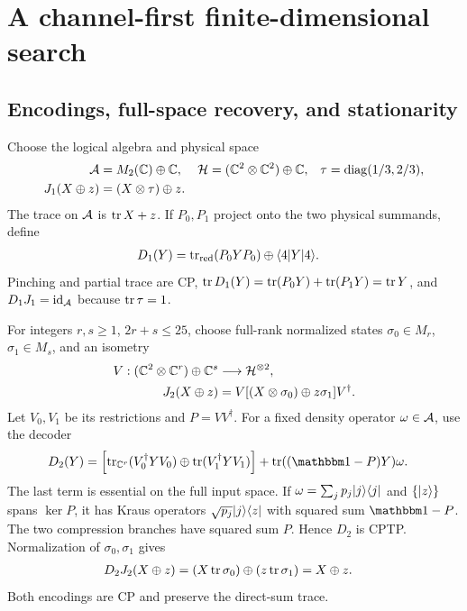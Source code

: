 \documentclass[aps,pra,reprint,nofootinbib,onecolumn]{revtex4-2}
\begin{document}
\section{A channel-first finite-dimensional search}
\label{sec:channels}

\subsection{Encodings, full-space recovery, and stationarity}

Choose the logical algebra and physical space
\begin{align}
	\mathcal{A}          & =M_2(\mathbb{C})\oplus\mathbb{C},           &
	\mathcal{H}          & =(\mathbb{C}^2\otimes\mathbb{C}^2)\oplus\mathbb{C}, &
	\tau           & =\operatorname{diag}(1/3,2/3),
	\nonumber                                      \\
	J_1(X\oplus z) & =(X\otimes\tau)\oplus z.
	\label{eq:J1}
\end{align}
The trace on $\mathcal{A}$ is $\operatorname{tr} X+z$. If $P_0,P_1$ project onto the
two physical summands, define
\begin{align}
	D_1(Y)
	 & =\operatorname{tr}_{\mathrm{red}}(P_0YP_0)\oplus\langle4\rvert Y\lvert4\rangle.
\end{align}
Pinching and partial trace are CP,
$\operatorname{tr} D_1(Y)=\operatorname{tr}(P_0Y)+\operatorname{tr}(P_1Y)=\operatorname{tr} Y$, and
$D_1J_1=\mathrm{id}_{\mathcal{A}}$ because $\operatorname{tr}\tau=1$.

For integers $r,s\geq1$, $2r+s\leq25$, choose full-rank normalized
states $\sigma_0\in M_r$, $\sigma_1\in M_s$, and an isometry
\begin{align}
	V:(\mathbb{C}^2\otimes\mathbb{C}^r)\oplus\mathbb{C}^s & \longrightarrow\mathcal{H}^{\otimes2},
	\nonumber                                                                        \\
	J_2(X\oplus z)
	                              & =V[(X\otimes\sigma_0)\oplus z\sigma_1]V^\dagger.
	\label{eq:J2}
\end{align}
Let $V_0,V_1$ be its restrictions and $P=VV^\dagger$.
For a fixed density operator $\omega\in\mathcal{A}$, use the decoder
\begin{align}
	D_2(Y)
	 & =\left[\tr_{\C^r}(V_0^\dagger YV_0)
		    \oplus\tr(V_1^\dagger YV_1)\right]
	+\tr((\Id-P)Y)\omega.
	\label{eq:D2}
\end{align}
The last term is essential on the full input space. If
$\omega=\sum_jp_j\lvert j\rangle\langle j\rvert$ and $\{\lvert z\rangle\}$ spans $\ker P$,
it has Kraus operators $\sqrt{p_j}\lvert j\rangle\langle z\rvert$ with squared sum
$\Id-P$. The two compression branches have squared sum $P$.
Hence $D_2$ is CPTP. Normalization of $\sigma_0,\sigma_1$ gives
\begin{align}
	D_2J_2(X\oplus z)
	 & =(X\operatorname{tr}\sigma_0)\oplus(z\operatorname{tr}\sigma_1)=X\oplus z.
\end{align}
Both encodings are CP and preserve the direct-sum trace.
\end{document}
